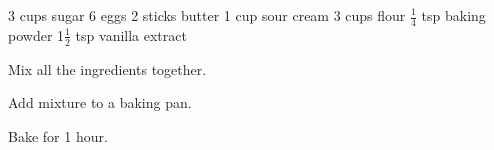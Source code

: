 \dishtype{}
\begin{ingreds}
    3 cups sugar
    6 eggs
    2 sticks butter
    1 cup sour cream
    3 cups flour
    $\frac{1}{4}$ tsp baking powder
    1$\frac{1}{2}$ tsp vanilla extract
\end{ingreds}
\begin{method}
    Mix all the ingredients together.\par
    Add mixture to a baking pan.\par
    Bake for 1 hour.
\end{method}